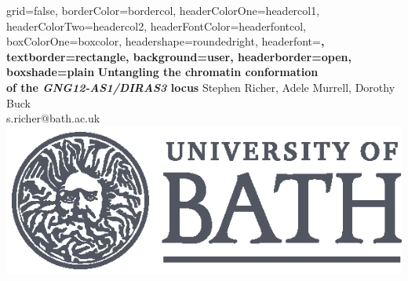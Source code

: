 \documentclass[a0paper,portrait]{baposter}
\begin{document}
\begin{poster}{
grid=false,
borderColor=bordercol, %
headerColorOne=headercol1, %
headerColorTwo=headercol2, %
headerFontColor=headerfontcol, %
boxColorOne=boxcolor, %
headershape=roundedright, %
headerfont=\Large\sf\bf, %
textborder=rectangle,
background=user,
headerborder=open, %
boxshade=plain
}
{}
%
%
{\sf\bf Untangling the chromatin conformation \\ of the \textit{GNG12-AS1/DIRAS3} locus} %
{\vspace{0.5em} Stephen Richer, Adele Murrell, Dorothy Buck\\ 
{\vspace{0.5em} s.richer@bath.ac.uk}} 
{\includegraphics[scale=0.9]{uob-logo.eps}}





\end{poster}
\end{document}
